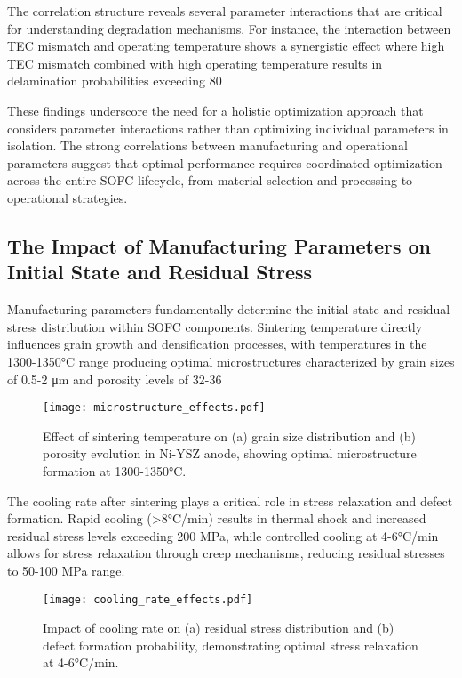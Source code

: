 \documentclass[10pt,conference]{IEEEtran}
\begin{document}
The correlation structure reveals several parameter interactions that are critical for understanding degradation mechanisms. For instance, the interaction between TEC mismatch and operating temperature shows a synergistic effect where high TEC mismatch combined with high operating temperature results in delamination probabilities exceeding 80%

These findings underscore the need for a holistic optimization approach that considers parameter interactions rather than optimizing individual parameters in isolation. The strong correlations between manufacturing and operational parameters suggest that optimal performance requires coordinated optimization across the entire SOFC lifecycle, from material selection and processing to operational strategies.

\subsection{The Impact of Manufacturing Parameters on Initial State and Residual Stress}

Manufacturing parameters fundamentally determine the initial state and residual stress distribution within SOFC components. Sintering temperature directly influences grain growth and densification processes, with temperatures in the 1300-1350°C range producing optimal microstructures characterized by grain sizes of 0.5-2 μm and porosity levels of 32-36%

\begin{figure}[H]
\centering
\texttt{[image: microstructure\_effects.pdf]}
\caption{Effect of sintering temperature on (a) grain size distribution and (b) porosity evolution in Ni-YSZ anode, showing optimal microstructure formation at 1300-1350°C.}
\label{fig:microstructure_effects}
\end{figure}

The cooling rate after sintering plays a critical role in stress relaxation and defect formation. Rapid cooling (>8°C/min) results in thermal shock and increased residual stress levels exceeding 200 MPa, while controlled cooling at 4-6°C/min allows for stress relaxation through creep mechanisms, reducing residual stresses to 50-100 MPa range.

\begin{figure}[H]
\centering
\texttt{[image: cooling\_rate\_effects.pdf]}
\caption{Impact of cooling rate on (a) residual stress distribution and (b) defect formation probability, demonstrating optimal stress relaxation at 4-6°C/min.}
\label{fig:cooling_rate_effects}
\end{figure}
\end{document}
